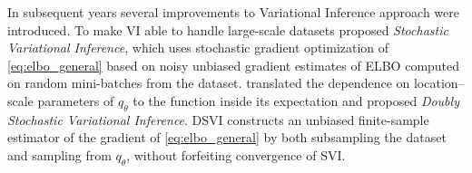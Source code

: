\documentclass[a4paper,10pt,twocolumn]{article}
\begin{document}
In subsequent years several improvements to Variational Inference approach were introduced.
To make VI able to handle large-scale datasets \citet{hoffman_stochastic_2013} proposed
\emph{Stochastic Variational Inference}, which uses stochastic gradient optimization of
\eqref{eq:elbo_general} based on noisy unbiased gradient estimates of ELBO
computed on random mini-batches from the dataset. \citet{titsias_doubly_2014} translated
the dependence on location–scale parameters of $q_{\theta}$ to the function inside its
expectation and proposed \emph{Doubly Stochastic Variational Inference}. DSVI constructs
an unbiased finite-sample estimator of the gradient of \eqref{eq:elbo_general} by both
subsampling the dataset and sampling from $q_{\theta}$, without forfeiting convergence
of SVI.
\end{document}
